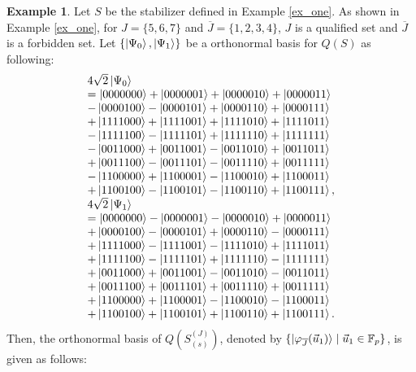 \documentclass[11pt,a4paper]{article}
\theoremstyle{definition}
\newtheorem{example}{Example}
\begin{document}
\begin{example}\label{ex_stabilizer}
    Let $S$ be the stabilizer defined in Example \ref{ex_one}.
    As shown in Example \ref{ex_one}, for \(J=\{5,6,7\}\) and \(\overline{J}=\{1,2,3,4\}\), 
    \(J\) is a qualified set and \(\overline{J}\) is a forbidden set.
    Let $\{\ket{\Psi_{0}},\ket{\Psi_{1}}\}$ be a orthonormal basis for $Q(S)$ as following:
    \begin{eqnarray*}
        \begin{array}{l}
            4\sqrt{2}\ket{\Psi_{0}} \\
            =\ket{0000000}+\ket{0000001}+\ket{0000010}+\ket{0000011}\\
            -\ket{0000100}-\ket{0000101}+\ket{0000110}+\ket{0000111}\\
            +\ket{1111000}+\ket{1111001}+\ket{1111010}+\ket{1111011}\\
            -\ket{1111100}-\ket{1111101}+\ket{1111110}+\ket{1111111}\\
            -\ket{0011000}+\ket{0011001}-\ket{0011010}+\ket{0011011}\\
            +\ket{0011100}-\ket{0011101}-\ket{0011110}+\ket{0011111}\\
            -\ket{1100000}+\ket{1100001}-\ket{1100010}+\ket{1100011}\\
            +\ket{1100100}-\ket{1100101}-\ket{1100110}+\ket{1100111},\\
            4\sqrt{2}\ket{\Psi_{1}} \\
            =\ket{0000000}-\ket{0000001}-\ket{0000010}+\ket{0000011}\\
            +\ket{0000100}-\ket{0000101}+\ket{0000110}-\ket{0000111}\\
            +\ket{1111000}-\ket{1111001}-\ket{1111010}+\ket{1111011}\\
            +\ket{1111100}-\ket{1111101}+\ket{1111110}-\ket{1111111}\\
            +\ket{0011000}+\ket{0011001}-\ket{0011010}-\ket{0011011}\\
            +\ket{0011100}+\ket{0011101}+\ket{0011110}+\ket{0011111}\\
            +\ket{1100000}+\ket{1100001}-\ket{1100010}-\ket{1100011}\\
            +\ket{1100100}+\ket{1100101}+\ket{1100110}+\ket{1100111}.\\
        \end{array}
    \end{eqnarray*}
    Then, the orthonormal basis of $Q\left(S_{(s)}^{(J)}\right)$, denoted by $\{\ket{\varphi_{\overline{J}}(\vec{u}_1)} \mid \vec{u}_1 \in \mathbb{F}_p\}$, is given as follows:

\end{example}
\end{document}
